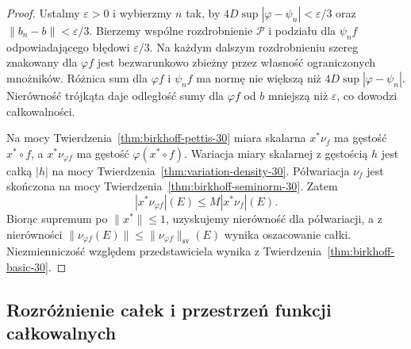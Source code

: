 \begin{proof}
Ustalmy $\varepsilon>0$ i wybierzmy $n$ tak, by
$4D\sup|\varphi-\psi_n|<\varepsilon/3$
oraz $\|b_n-b\|<\varepsilon/3$.
Bierzemy wspólne rozdrobnienie $\mathcal P$
i podziału dla $\psi_n f$ odpowiadającego
błędowi $\varepsilon/3$. Na każdym dalszym
rozdrobnieniu szereg znakowany dla $\varphi f$
jest bezwarunkowo zbieżny przez własność
ograniczonych mnożników. Różnica sum dla
$\varphi f$ i $\psi_n f$ ma normę nie większą
niż $4D\sup|\varphi-\psi_n|$.
Nierówność trójkąta daje odległość sumy
dla $\varphi f$ od $b$ mniejszą niż $\varepsilon$,
co dowodzi całkowalności.

Na mocy Twierdzenia~\ref{thm:birkhoff-pettis-30}
miara skalarna $x^*\nu_f$ ma gęstość $x^*\circ f$,
a $x^*\nu_{\varphi f}$ ma gęstość $\varphi(x^*\circ f)$.
Wariacja miary skalarnej z gęstością $h$ jest
całką $|h|$ na mocy Twierdzenia~\ref{thm:variation-density-30}.
Półwariacja $\nu_f$ jest skończona na mocy
Twierdzenia~\ref{thm:birkhoff-seminorm-30}. Zatem
\[
 |x^*\nu_{\varphi f}|(E)
 \le M|x^*\nu_f|(E).
\]
Biorąc supremum po $\|x^*\|\le1$, uzyskujemy
nierówność dla półwariacji, a z nierówności
$\|\nu_{\varphi f}(E)\|\le\|\nu_{\varphi f}\|_{\mathrm{sv}}(E)$
wynika oszacowanie całki.
Niezmienniczość względem przedstawiciela wynika
z Twierdzenia~\ref{thm:birkhoff-basic-30}.
\end{proof}

\subsection{Rozróżnienie całek i przestrzeń funkcji całkowalnych}

